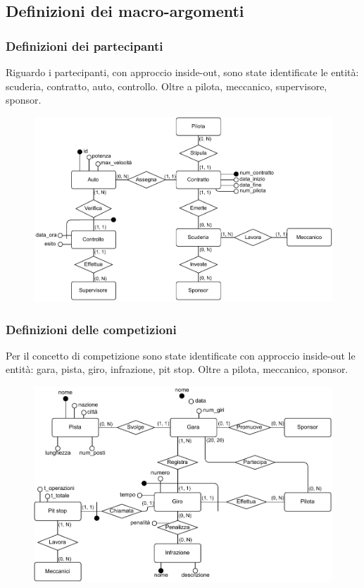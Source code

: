 \documentclass[11pt]{article}
\begin{document}
\subsection{Definizioni dei macro-argomenti}
\subsubsection{Definizioni dei partecipanti}
Riguardo i partecipanti, con approccio inside-out, sono state identificate le entità: scuderia, contratto, auto, controllo. Oltre a pilota, meccanico, supervisore, sponsor.
\begin{figure}[H]
    \centering
    \includegraphics[width=15.5cm]{../er/gare_scuderie.pdf}
\end{figure}

\subsubsection{Definizioni delle competizioni}
Per il concetto di competizione sono state identificate con approccio inside-out le entità: gara, pista, giro, infrazione, pit stop. Oltre a pilota, meccanico, sponsor.
\begin{figure}[H]
    \centering
    \includegraphics[width=15.5cm]{../er/gare_gara.pdf} %
\end{figure}                                            %
\end{document}
